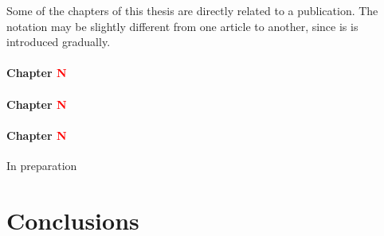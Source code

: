 Some of the chapters of this thesis are directly related to a publication. The notation may be slightly different from one article to another, since is is introduced gradually.

\paragraph{Chapter \textcolor{red}{\bfseries N}} 
\paragraph{Chapter \textcolor{red}{\bfseries N}} 
\paragraph{Chapter \textcolor{red}{\bfseries N}} In preparation




\section{Conclusions}


